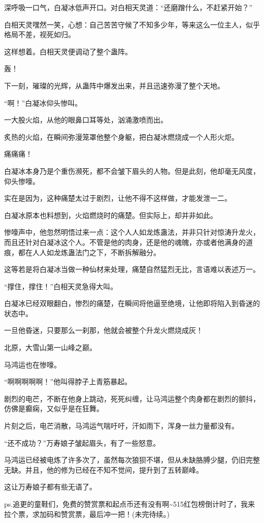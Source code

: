 \begin{this_body}
深呼吸一口气，白凝冰低声开口。对白相天灵道：“还磨蹭什么，不赶紧开始？”

白相天灵嘿然一笑，心想：自己苦苦守候了不知多少年，等来这么一位主人，似乎格局不差，视死如归。

这样想着。白相天灵便调动了整个蛊阵。

轰！

下一刻，璀璨的光辉，从蛊阵中爆发出来，并且迅速弥漫了整个天地。

“啊！”白凝冰仰头惨叫。

一大股火焰，从他的眼鼻口耳等处，汹涌激喷而出。

炙热的火焰，在瞬间弥漫笼罩他整个身躯，把白凝冰燃烧成一个人形火炬。

痛痛痛！

白凝冰本身乃是个重伤濒死，都不会皱下眉头的人物。但是此刻，他却毫无风度，仰头惨嚎。

实在是因为，这种痛楚太过于剧烈，让他不得不这样做，才能发泄一二。

白凝冰原本也料想到，火焰燃烧时的痛楚。但实际上，却并非如此。

惨嚎声中，他忽然明悟过来一点：这个人人如龙炼蛊法，并非只针对惊涛升龙火，而且还针对白凝冰这个人。不管是他的肉身，还是他的魂魄，亦或者他满身的道痕，都在人人如龙炼蛊法门之下，不断拆解融分。

这等若是将白凝冰当做一种仙材来处理，痛楚自然猛烈无比，言语难以表述万一。

“撑住，撑住！”白相天灵急得大叫。

白凝冰已经双眼翻白，惨烈的痛楚，在瞬间将他逼至绝境，让他即将陷入到昏迷的状态中。

一旦他昏迷，只要那么一刹那，他就会被整个升龙火燃烧成灰！

北原，大雪山第一山峰之巅。

马鸿运也在惨嚎。

“啊啊啊啊啊！”他叫得脖子上青筋暴起。

剧烈的电芒，不断在他身上跳动，死死纠缠，让马鸿运整个肉身都在剧烈的颤抖，仿佛是癫痫，又似乎是在狂舞。

片刻之后，电芒消散，马鸿运气喘吁吁，汗如雨下，浑身一丝力量都没有。

“还不成功？”万寿娘子皱起眉头，有了一些怒意。

马鸿运已经被电炼了许多次了，虽然每次狼狈不堪，但从未缺胳膊少腿，仍旧完整无缺。并且，他的修为已经在不知不觉间，提升到了五转巅峰。

这让万寿娘子都有些无语了。

ps.追更的童鞋们，免费的赞赏票和起点币还有没有啊\~{}515红包榜倒计时了，我来拉个票，求加码和赞赏票，最后冲一把！(未完待续。)

\end{this_body}

